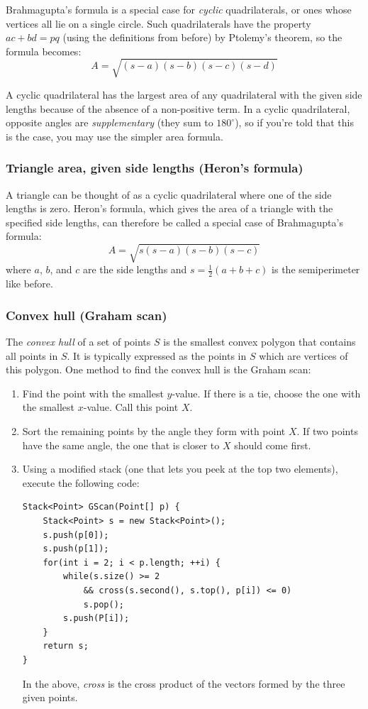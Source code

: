\documentclass[a4paper,12pt]{article}
\begin{document}
Brahmagupta's formula is a special case for {\em cyclic} quadrilaterals, or ones whose vertices all lie on a single circle. Such quadrilaterals have the property $ac+bd=pq$ (using the definitions from before) by Ptolemy's theorem, so the formula becomes:
\[A=\sqrt{(s-a)(s-b)(s-c)(s-d)}\]

A cyclic quadrilateral has the largest area of any quadrilateral with the given side lengths because of the absence of a non-positive term. In a cyclic quadrilateral, opposite angles are {\em  supplementary} (they sum to $180^{\circ}$), so if you're told that this is the case, you may use the simpler area formula.

\subsubsection{Triangle area, given side lengths (Heron's formula)}
A triangle can be thought of as a cyclic quadrilateral where one of the side lengths is zero. Heron's formula, which gives the area of a triangle with the specified side lengths, can therefore be called a special case of Brahmagupta's formula:
\[A=\sqrt{s(s-a)(s-b)(s-c)}\]
\noindent where $a$, $b$, and $c$ are the side lengths and $s=\frac{1}{2}\left(a+b+c\right)$ is the semiperimeter like before.

\subsubsection{Convex hull (Graham scan)}
The {\em convex hull} of a set of points $S$ is the smallest convex polygon that contains all points in $S$. It is typically expressed as the points in $S$ which are vertices of this polygon. One method to find the convex hull is the Graham scan:

\begin{enumerate}
\item Find the point with the smallest $y$-value. If there is a tie, choose the one with the smallest $x$-value. Call this point $X$.
\item Sort the remaining points by the angle they form with point $X$. If two points have the same angle, the one that is closer to $X$ should come first.
\item Using a modified stack (one that lets you peek at the top two elements), execute the following code:
\begin{lstlisting}
Stack<Point> GScan(Point[] p) {
	Stack<Point> s = new Stack<Point>();
	s.push(p[0]);
	s.push(p[1]);
	for(int i = 2; i < p.length; ++i) {
		while(s.size() >= 2
			&& cross(s.second(), s.top(), p[i]) <= 0)
			s.pop();
		s.push(P[i]);
	}
	return s;
}
\end{lstlisting}

In the above, {\em cross} is the cross product of the vectors formed by the three given points.

\end{enumerate}
\end{document}
